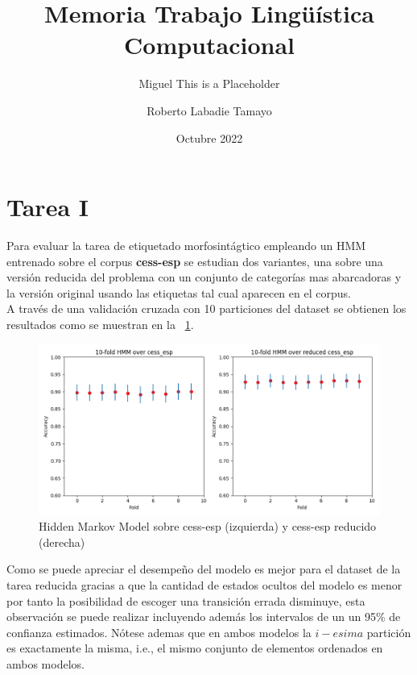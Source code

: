 \documentclass[11pt,a4paper]{report}
\date{}
\begin{document}
\title{Memoria Trabajo Lingüística Computacional}
\author{  Miguel This is a Placeholder\and Roberto Labadie Tamayo}
	\date{Octubre 2022}
	\maketitle
	
	
	\section*{Tarea I}
		
		Para evaluar la tarea de etiquetado morfosintágtico empleando un HMM entrenado sobre el corpus \textbf{cess-esp} se estudian dos variantes, una sobre una versión reducida del problema con un conjunto de categorías mas abarcadoras y la versión original usando las etiquetas tal cual aparecen en el corpus.
		\\
		A través de una validación cruzada con 10 particiones del dataset se obtienen los resultados como se muestran en la \figurename~\ref{HMM_task1}.
		
		\begin{figure}[!thb]
		\begin{center}
			\includegraphics[scale=0.6]{images/HMM_task1.png}
		\end{center}
		\caption{Hidden Markov Model sobre cess-esp (izquierda) y cess-esp reducido (derecha) }
		\label{HMM_task1}
	\end{figure}
	
	Como se puede apreciar el desempeño del modelo es mejor para el dataset de la tarea reducida gracias a que la cantidad de estados ocultos del modelo es menor por tanto la posibilidad de escoger una transición errada disminuye, esta observación se puede realizar incluyendo además los intervalos de un  un 95\% de confianza estimados. Nótese ademas que en ambos modelos la $i-esima$ partición es exactamente la misma, i.e., el mismo conjunto de elementos ordenados en ambos modelos.
	
\end{document}
